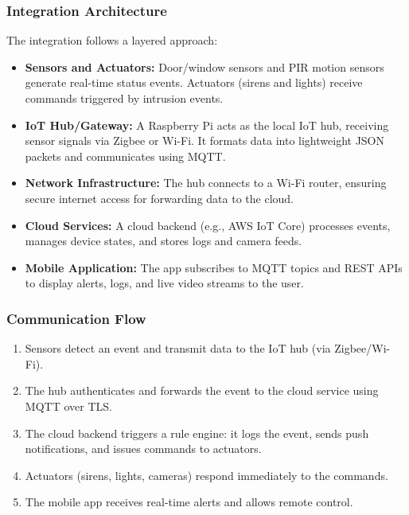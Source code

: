 \documentclass[conference]{IEEEtran}
\begin{document}
\subsubsection{Integration Architecture}
The integration follows a layered approach:
\begin{itemize}
    \item \textbf{Sensors and Actuators:} Door/window sensors and PIR motion sensors generate real-time status events. Actuators (sirens and lights) receive commands triggered by intrusion events.
    \item \textbf{IoT Hub/Gateway:} A Raspberry Pi acts as the local IoT hub, receiving sensor signals via Zigbee or Wi-Fi. It formats data into lightweight JSON packets and communicates using MQTT.
    \item \textbf{Network Infrastructure:} The hub connects to a Wi-Fi router, ensuring secure internet access for forwarding data to the cloud.
    \item \textbf{Cloud Services:} A cloud backend (e.g., AWS IoT Core) processes events, manages device states, and stores logs and camera feeds.
    \item \textbf{Mobile Application:} The app subscribes to MQTT topics and REST APIs to display alerts, logs, and live video streams to the user.
\end{itemize}




\subsubsection{Communication Flow}
\begin{enumerate}
    \item Sensors detect an event and transmit data to the IoT hub (via Zigbee/Wi-Fi).
    \item The hub authenticates and forwards the event to the cloud service using MQTT over TLS.
    \item The cloud backend triggers a rule engine: it logs the event, sends push notifications, and issues commands to actuators.
    \item Actuators (sirens, lights, cameras) respond immediately to the commands.
    \item The mobile app receives real-time alerts and allows remote control.
\end{enumerate}
\end{document}
